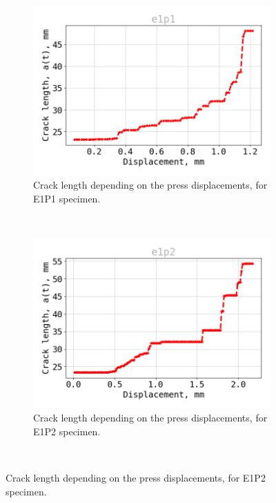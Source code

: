 \begin{figure}[H]
	\centering
	\begin{subfigure}{0.48\linewidth}
		\centering
		\includegraphics[width=\textwidth]{Figures/e1p1_a}
		\decoRule
		\caption[Crack length E1P1]{Crack length depending on the press displacements, for E1P1 specimen.}
		\label{fig:E1P1_a}
	\end{subfigure}
	\hfill \\
	\begin{subfigure}{0.48\linewidth}
		\centering
		\includegraphics[width=\textwidth]{Figures/e1p2_a}
		\decoRule
		\caption[Crack length E1P2]{Crack length depending on the press displacements, for E1P2 specimen.}
		\label{fig:E1P2_a}
	\end{subfigure}
	\hfill\\

\end{figure}

